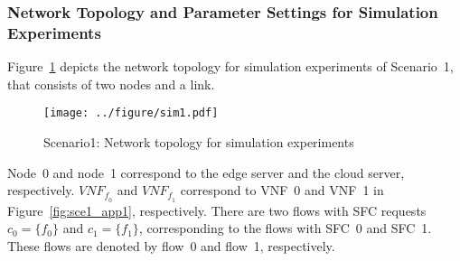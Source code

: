 \documentclass[technicalreport]{ieicej}
\begin{document}
	\subsubsection{Network Topology and Parameter Settings for Simulation Experiments}
	Figure~\ref{fig:sce1_topology} depicts the network topology for simulation experiments of Scenario~1, that consists of two nodes and a link.
	\begin{figure}[!t]
		\centering
		\texttt{[image: ../figure/sim1.pdf]}
		\caption{Scenario1: Network topology for simulation experiments}
		\label{fig:sce1_topology}
	\end{figure}
	Node~0 and node~1 correspond to the edge server and the cloud server, respectively.
	$\mathit{VNF_{f_0}}$ and $\mathit{VNF_{f_1}}$ correspond to VNF~0 and VNF~1 in Figure~\ref{fig:sce1_app1}, respectively.
	There are two flows with SFC requests $c_0 = \{f_{0}\}$ and $c_1 = \{f_{1}\}$, corresponding to the flows with SFC~0 and SFC~1.
	These flows are denoted by flow~0 and flow~1, respectively.
\end{document}

